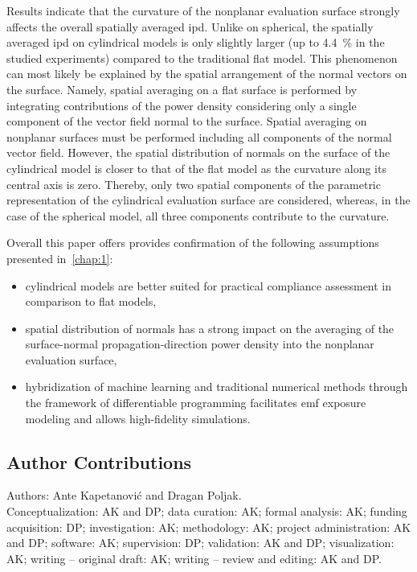 Results indicate that the curvature of the nonplanar evaluation surface strongly affects the overall spatially averaged \gls{ipd}.
Unlike on spherical, the spatially averaged \gls{ipd} on cylindrical models is only slightly larger (up to \SI{4.4}{\percent} in the studied experiments) compared to the traditional flat model.
This phenomenon can most likely be explained by the spatial arrangement of the normal vectors on the surface.
Namely, spatial averaging on a flat surface is performed by integrating contributions of the power density considering only a single component of the vector field normal to the surface.
Spatial averaging on nonplanar surfaces must be performed including all components of the normal vector field.
However, the spatial distribution of normals on the surface of the cylindrical model is closer to that of the flat model as the curvature along its central axis is zero.
Thereby, only two spatial components of the parametric representation of the cylindrical evaluation surface are considered, whereas, in the case of the spherical model, all three components contribute to the curvature.

Overall this paper offers provides confirmation of the following assumptions presented in~\cref{chap:1}:
\begin{itemize}
    \item cylindrical models are better suited for practical compliance assessment in comparison to flat models,
    \item spatial distribution of normals has a strong impact on the averaging of the surface-normal propagation-direction power density into the nonplanar evaluation surface,
    \item hybridization of machine learning and traditional numerical methods through the framework of differentiable programming facilitates \gls{emf} exposure modeling and allows high-fidelity simulations.
\end{itemize}

\subsection{Author Contributions}
Authors: Ante Kapetanović and Dragan Poljak.\\
Conceptualization: AK and DP; data curation: AK; formal analysis: AK; funding acquisition: DP; investigation: AK; methodology: AK; project administration: AK and DP; software: AK; supervision: DP; validation: AK and DP; visualization: AK; writing -- original draft: AK; writing -- review and editing: AK and DP.

